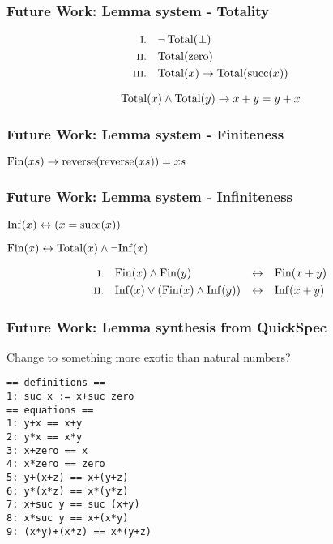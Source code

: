 \documentclass[serif,professionalfont]{beamer}
\begin{document}
\begin{frame}
\frametitle{Future Work: Lemma system - Totality}
\label{sec-6}


\centering
{}

\vspace{\baselineskip}

\begin{align*}
\rom{1} &&        & \neg \, \Total(\bot) \\
\rom{2} &&        & \Total(\fn{zero}) \\
\rom{3} && \fa{x} & \Total(x) \rightarrow \Total(\fn{succ}(x))
\end{align*}

\pause

\begin{equation*}
\faa{x}{y} \Total(x) \wedge \Total(y) \rightarrow x + y = y + x
\end{equation*}
\end{frame}
\begin{frame}
\frametitle{Future Work: Lemma system - Finiteness}
\label{sec-7}


\begin{center}
$\fa{xs} \Fin(xs) \rightarrow \fn{reverse}(\fn{reverse}(xs)) = xs$
\end{center}
\end{frame}
\begin{frame}
\frametitle{Future Work: Lemma system - Infiniteness}
\label{sec-8}


\begin{center}
$\fa{x} \Inf(x) \leftrightarrow (x = \fn{succ}(x))$
\end{center}

\vspace{1\baselineskip}

\pause

\begin{center}
$\Fin(x) \leftrightarrow \Total(x) \wedge \neg \Inf(x)$
\end{center}

\pause

\begin{align*}
\rom{1} && \faa{x}{y} & \Fin(x) \wedge \Fin(y)                & \leftrightarrow &&& \Fin(x + y) \\
\rom{2} && \faa{x}{y} & \Inf(x) \vee (\Fin(x) \wedge \Inf(y)) & \leftrightarrow &&& \Inf(x + y)
\end{align*}
\end{frame}

\begin{frame}[fragile]
\frametitle{Future Work: Lemma synthesis from QuickSpec}
Change to something more exotic than natural numbers?

\begin{verbatim}
== definitions ==
1: suc x := x+suc zero
== equations ==
1: y+x == x+y
2: y*x == x*y
3: x+zero == x
4: x*zero == zero
5: y+(x+z) == x+(y+z)
6: y*(x*z) == x*(y*z)
7: x+suc y == suc (x+y)
8: x*suc y == x+(x*y)
9: (x*y)+(x*z) == x*(y+z)
\end{verbatim}
\end{frame}
\end{document}
